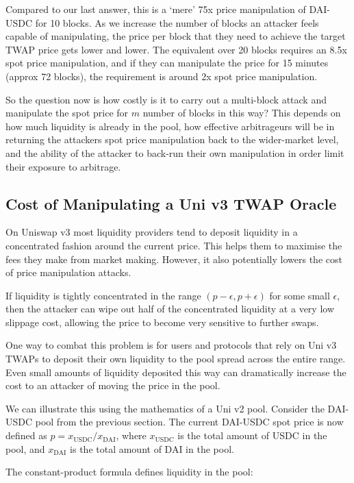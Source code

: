 \documentclass[a4paper, 11pt]{article}
\begin{document}
Compared to our last answer, this is a `mere' 75x price manipulation of DAI-USDC for 10 blocks. As we increase the number of blocks an attacker feels capable of manipulating, the price per block that they need to achieve the target TWAP price gets lower and lower. The equivalent over 20 blocks requires an 8.5x spot price manipulation, and if they can manipulate the price for 15 minutes (approx 72 blocks), the requirement is around 2x spot price manipulation.

So the question now is how costly is it to carry out a multi-block attack and manipulate the spot price for $m$ number of blocks in this way? This depends on how much liquidity is already in the pool, how effective arbitrageurs will be in returning the attackers spot price manipulation back to the wider-market level, and the ability of the attacker to back-run their own manipulation in order limit their exposure to arbitrage.

\subsection{Cost of Manipulating a Uni v3 TWAP Oracle}

On Uniswap v3 most liquidity providers tend to deposit liquidity in a concentrated fashion around the current price. This helps them to maximise the fees they make from market making. However, it also potentially lowers the cost of price manipulation attacks. 

If liquidity is tightly concentrated in the range $(p -\epsilon, p + \epsilon)$ for some small $\epsilon$, then the attacker can wipe out half of the concentrated liquidity at a very low slippage cost, allowing the price to become very sensitive to further swaps.  

One way to combat this problem is for users and protocols that rely on Uni v3 TWAPs to deposit their own liquidity to the pool spread across the entire range. Even small amounts of liquidity deposited this way can dramatically increase the cost to an attacker of moving the price in the pool.

We can illustrate this using the mathematics of a Uni v2 pool. Consider the DAI-USDC pool from the previous section. The current DAI-USDC spot price is now defined as $p = x_{\text{USDC}}/x_{\text{DAI}}$, where $x_{\text{USDC}}$ is the total amount of USDC in the pool, and $x_{\text{DAI}}$ is the total amount of DAI in the pool. 

The constant-product formula defines liquidity in the pool:
\end{document}
